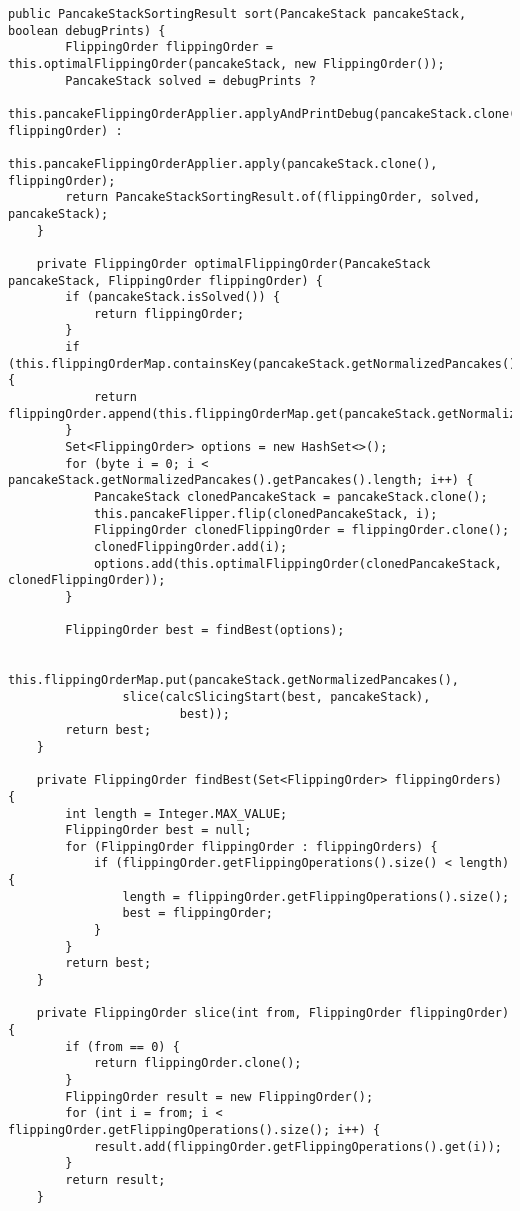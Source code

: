 \begin{lstlisting}[label={lst:source}]
    public PancakeStackSortingResult sort(PancakeStack pancakeStack, boolean debugPrints) {
        FlippingOrder flippingOrder = this.optimalFlippingOrder(pancakeStack, new FlippingOrder());
        PancakeStack solved = debugPrints ?
                this.pancakeFlippingOrderApplier.applyAndPrintDebug(pancakeStack.clone(), flippingOrder) :
                this.pancakeFlippingOrderApplier.apply(pancakeStack.clone(), flippingOrder);
        return PancakeStackSortingResult.of(flippingOrder, solved, pancakeStack);
    }

    private FlippingOrder optimalFlippingOrder(PancakeStack pancakeStack, FlippingOrder flippingOrder) {
        if (pancakeStack.isSolved()) {
            return flippingOrder;
        }
        if (this.flippingOrderMap.containsKey(pancakeStack.getNormalizedPancakes())) {
            return flippingOrder.append(this.flippingOrderMap.get(pancakeStack.getNormalizedPancakes()));
        }
        Set<FlippingOrder> options = new HashSet<>();
        for (byte i = 0; i < pancakeStack.getNormalizedPancakes().getPancakes().length; i++) {
            PancakeStack clonedPancakeStack = pancakeStack.clone();
            this.pancakeFlipper.flip(clonedPancakeStack, i);
            FlippingOrder clonedFlippingOrder = flippingOrder.clone();
            clonedFlippingOrder.add(i);
            options.add(this.optimalFlippingOrder(clonedPancakeStack, clonedFlippingOrder));
        }

        FlippingOrder best = findBest(options);

        this.flippingOrderMap.put(pancakeStack.getNormalizedPancakes(),
                slice(calcSlicingStart(best, pancakeStack),
                        best));
        return best;
    }

    private FlippingOrder findBest(Set<FlippingOrder> flippingOrders) {
        int length = Integer.MAX_VALUE;
        FlippingOrder best = null;
        for (FlippingOrder flippingOrder : flippingOrders) {
            if (flippingOrder.getFlippingOperations().size() < length) {
                length = flippingOrder.getFlippingOperations().size();
                best = flippingOrder;
            }
        }
        return best;
    }

    private FlippingOrder slice(int from, FlippingOrder flippingOrder) {
        if (from == 0) {
            return flippingOrder.clone();
        }
        FlippingOrder result = new FlippingOrder();
        for (int i = from; i < flippingOrder.getFlippingOperations().size(); i++) {
            result.add(flippingOrder.getFlippingOperations().get(i));
        }
        return result;
    }


\end{lstlisting}
